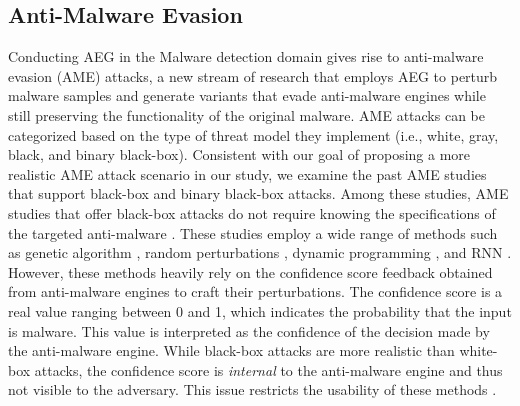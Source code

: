 \documentclass[letterpaper]{article}
\begin{document}
\subsection{Anti-Malware Evasion}
    Conducting AEG in the Malware detection domain gives rise to anti-malware evasion (AME) attacks, a new stream of research that employs AEG to perturb malware samples and generate variants that evade anti-malware engines while still preserving the functionality of the original malware. AME attacks can be categorized based on the type of threat model they implement (i.e., white, gray, black, and binary black-box). Consistent with our goal of proposing a more realistic AME attack scenario in our study, we examine the past AME studies that support black-box and binary black-box attacks.
    Among these studies, AME studies that offer black-box attacks do not require knowing the specifications of the targeted anti-malware \cite{demetrio2020efficient,castroandbiggio2019poster,castroandschmitt2019armed,chenB2019adversarial,park2019generation,suciu2019exploring,hu2018black}. These studies employ a wide range of methods such as genetic algorithm \cite{demetrio2020efficient}, random perturbations \cite{castroandschmitt2019armed,chenB2019adversarial}, dynamic programming \cite{park2019generation}, and RNN \cite{hu2018black}. However, these methods heavily rely on the confidence score feedback obtained from anti-malware engines to craft their perturbations. The confidence score is a real value ranging between 0 and 1, which indicates the probability that the input is malware. This value is interpreted as the confidence of the decision made by the anti-malware engine. While black-box attacks are more realistic than white-box attacks, the confidence score is \textit{internal} to the anti-malware engine and thus not visible to the adversary. This issue restricts the usability of these methods \cite{rosenberg2019defense}.
    
\end{document}

